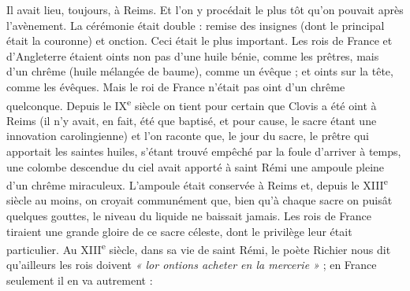 \documentclass[french,twoside]{book} %
\begin{document}
Il avait lieu, toujours, à Reims. Et l’on y procédait le plus tôt qu’on pouvait après l’avènement. La cérémonie était double : remise des insignes (dont le principal était la couronne) et onction. Ceci était le plus important. Les rois de France et d’Angleterre étaient oints non pas d’une huile bénie, comme les prêtres, mais d’un chrême (huile mélangée de baume), comme un évêque ; et oints sur la tête, comme les évêques. Mais le roi de France n’était pas oint d’un chrême quelconque. Depuis le IX\textsuperscript{e} siècle on tient pour certain que Clovis a été oint à Reims (il n’y avait, en fait, été que baptisé, et pour cause, le sacre étant une innovation carolingienne) et l’on raconte que, le jour du sacre, le prêtre qui apportait les saintes huiles, s’étant trouvé empêché par la foule d’arriver à temps, une colombe descendue du ciel avait apporté à saint Rémi une ampoule pleine d’un chrême miraculeux. L’ampoule était conservée à Reims et, depuis le XIII\textsuperscript{e} siècle au moins, on croyait communément que, bien qu’à chaque sacre on puisât quelques gouttes, le niveau du liquide ne baissait jamais. Les rois de France tiraient une grande gloire de ce sacre céleste, dont le privilège leur était particulier. Au XIII\textsuperscript{e} siècle, dans sa vie de saint Rémi, le poète Richier nous dit qu’ailleurs les rois doivent \emph{« lor ontions acheter en la mercerie »} ; en France seulement il en va autrement :\par
\end{document}
